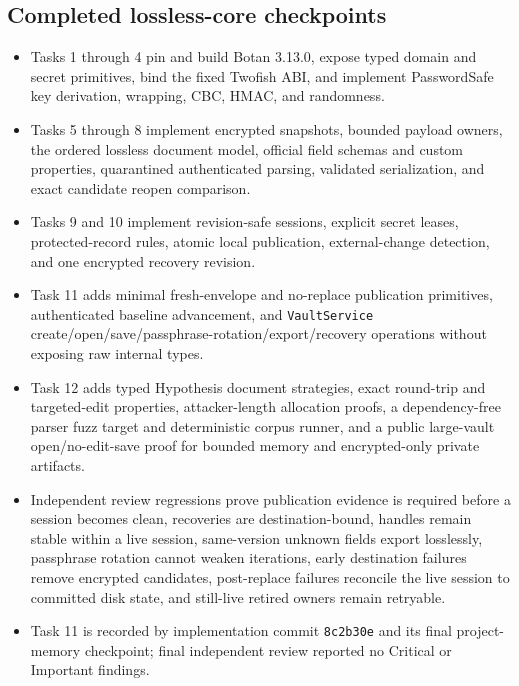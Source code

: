 \documentclass[
  letterpaper,
]{article}
\newcommand{\passthrough}[1]{#1}
\providecommand{\tightlist}{%
  \setlength{\itemsep}{0pt}\setlength{\parskip}{0pt}}
\begin{document}
\subsection{Completed lossless-core checkpoints}\label{completed-lossless-core-checkpoints}

\begin{itemize}
\tightlist
\item
  Tasks 1 through 4 pin and build Botan 3.13.0, expose typed domain and secret primitives, bind the fixed Twofish ABI,
  and implement PasswordSafe key derivation, wrapping, CBC, HMAC, and randomness.
\item
  Tasks 5 through 8 implement encrypted snapshots, bounded payload owners, the ordered lossless document model, official
  field schemas and custom properties, quarantined authenticated parsing, validated serialization, and exact candidate
  reopen comparison.
\item
  Tasks 9 and 10 implement revision-safe sessions, explicit secret leases, protected-record rules, atomic local
  publication, external-change detection, and one encrypted recovery revision.
\item
  Task 11 adds minimal fresh-envelope and no-replace publication primitives, authenticated baseline advancement, and
  \nolinkurl{VaultService} create/open/save/passphrase-rotation/export/recovery operations without exposing raw internal
  types.
\item
  Task 12 adds typed Hypothesis document strategies, exact round-trip and targeted-edit properties, attacker-length
  allocation proofs, a dependency-free parser fuzz target and deterministic corpus runner, and a public large-vault
  open/no-edit-save proof for bounded memory and encrypted-only private artifacts.
\item
  Independent review regressions prove publication evidence is required before a session becomes clean, recoveries are
  destination-bound, handles remain stable within a live session, same-version unknown fields export losslessly,
  passphrase rotation cannot weaken iterations, early destination failures remove encrypted candidates, post-replace
  failures reconcile the live session to committed disk state, and still-live retired owners remain retryable.
\item
  Task 11 is recorded by implementation commit \passthrough{\lstinline!8c2b30e!} and its final project-memory
  checkpoint; final independent review reported no Critical or Important findings.
\end{itemize}
\end{document}
